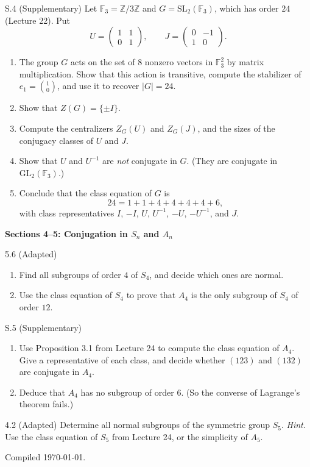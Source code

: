 \documentclass[11pt]{article}
\newcommand{\Z}{\mathbb{Z}}
\newcommand{\F}{\mathbb{F}}
\newcommand{\SL}{\mathrm{SL}}
\newcommand{\GL}{\mathrm{GL}}
\newcommand{\sectionheading}[1]{%
  \Needspace{8\baselineskip}
  \vspace{0.25em}
  {\color{darkgray}\large\bfseries #1}\par
}
\begin{document}
\begin{exercise}[breakable]{S.4 (Supplementary)}
Let $\F_3=\Z/3\Z$ and $G=\SL_2(\F_3)$, which has order $24$ (Lecture 22).
Put
\[
  U=\begin{pmatrix}1&1\\0&1\end{pmatrix},\qquad
  J=\begin{pmatrix}0&-1\\1&0\end{pmatrix}.
\]
\begin{enumerate}[label=\textbf{(\alph*)}]
  \item The group $G$ acts on the set of $8$ nonzero vectors in $\F_3^2$ by
        matrix multiplication. Show that this action is transitive, compute
        the stabilizer of $e_1=\binom10$, and use it to recover $|G|=24$.
  \item Show that $Z(G)=\{\pm I\}$.
  \item Compute the centralizers $Z_G(U)$ and $Z_G(J)$, and the sizes of
        the conjugacy classes of $U$ and $J$.
  \item Show that $U$ and $U^{-1}$ are \emph{not} conjugate in $G$.
        (They are conjugate in $\GL_2(\F_3)$.)
  \item Conclude that the class equation of $G$ is
        \[
          24=1+1+4+4+4+4+6,
        \]
        with class representatives $I$, $-I$, $U$, $U^{-1}$, $-U$, $-U^{-1}$, and $J$.
\end{enumerate}
\end{exercise}

\sectionheading{Sections 4--5: Conjugation in $S_n$ and $A_n$}

\begin{exercise}{5.6 (Adapted)}
\begin{enumerate}[label=\textbf{(\alph*)}]
  \item Find all subgroups of order $4$ of $S_4$, and decide which ones
        are normal.
  \item Use the class equation of $S_4$ to prove that $A_4$ is the only
        subgroup of $S_4$ of order $12$.
\end{enumerate}
\end{exercise}

\begin{exercise}{S.5 (Supplementary)}
\begin{enumerate}[label=\textbf{(\alph*)}]
  \item Use Proposition 3.1 from Lecture 24 to compute the class equation
        of $A_4$. Give a representative of each class, and decide whether
        $(123)$ and $(132)$ are conjugate in $A_4$.
  \item Deduce that $A_4$ has no subgroup of order $6$. (So the converse of
        Lagrange's theorem fails.)
\end{enumerate}
\end{exercise}

\begin{exercise}{4.2 (Adapted)}
Determine all normal subgroups of the symmetric group $S_5$.
\textit{Hint.} Use the class equation of $S_5$ from Lecture 24, or the
simplicity of $A_5$.
\end{exercise}

\vfill
{\small\color{darkgray}Compiled \today.}
\end{document}
